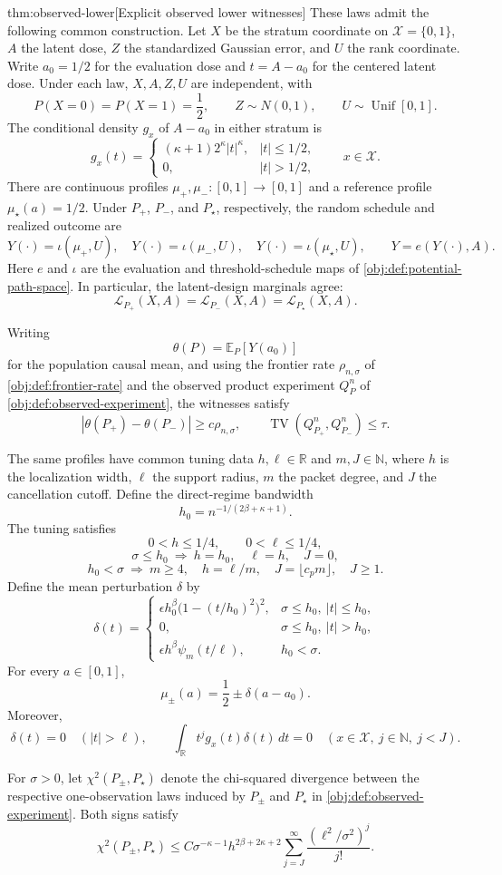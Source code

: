 \begin{theoremv}{thm:observed-lower}[Explicit observed lower witnesses]
These laws admit the following common construction. Let \(X\) be the stratum coordinate on \(\mathcal X=\{0,1\}\), \(A\) the latent dose, \(Z\) the standardized Gaussian error, and \(U\) the rank coordinate. Write \(a_0=1/2\) for the evaluation dose and \(t=A-a_0\) for the centered latent dose. Under each law, \(X,A,Z,U\) are independent, with
\[
P(X=0)=P(X=1)=\frac12,\qquad
Z\sim N(0,1),\qquad U\sim\operatorname{Unif}[0,1].
\]
The conditional density \(g_x\) of \(A-a_0\) in either stratum is
\[
g_x(t)=
\begin{cases}
(\kappa+1)2^\kappa|t|^\kappa,& |t|\le1/2,\\
0,& |t|>1/2,
\end{cases}
\qquad x\in\mathcal X.
\]
There are continuous profiles \(\mu_+,\mu_-:[0,1]\to[0,1]\) and a reference profile \(\mu_\star(a)=1/2\). Under \(P_+\), \(P_-\), and \(P_\star\), respectively, the random schedule and realized outcome are
\[
Y(\cdot)=\iota(\mu_+,U),\quad
Y(\cdot)=\iota(\mu_-,U),\quad
Y(\cdot)=\iota(\mu_\star,U),
\qquad
Y=e(Y(\cdot),A).
\]
Here \(e\) and \(\iota\) are the evaluation and threshold-schedule maps of \cref{obj:def:potential-path-space}. In particular, the latent-design marginals agree:
\[
\mathcal L_{P_+}(X,A)=
\mathcal L_{P_-}(X,A)=
\mathcal L_{P_\star}(X,A).
\]

Writing
\[
\theta(P)=\mathbb E_P[Y(a_0)]
\]
for the population causal mean, and using the frontier rate \(\rho_{n,\sigma}\) of \cref{obj:def:frontier-rate} and the observed product experiment \(Q_P^n\) of \cref{obj:def:observed-experiment}, the witnesses satisfy
\[
|\theta(P_+)-\theta(P_-)|\ge c\rho_{n,\sigma},
\qquad
\operatorname{TV}(Q_{P_+}^n,Q_{P_-}^n)\le\tau.
\]

The same profiles have common tuning data \(h,\ell\in\mathbb R\) and \(m,J\in\mathbb N\), where \(h\) is the localization width, \(\ell\) the support radius, \(m\) the packet degree, and \(J\) the cancellation cutoff. Define the direct-regime bandwidth
\[
h_0=n^{-1/(2\beta+\kappa+1)}.
\]
The tuning satisfies
\[
0<h\le1/4,\qquad 0<\ell\le1/4,
\]
\[
\sigma\le h_0\ \Longrightarrow\
h=h_0,\quad \ell=h,\quad J=0,
\]
\[
h_0<\sigma\ \Longrightarrow\
m\ge4,\quad h=\ell/m,\quad
J=\lfloor c_pm\rfloor,\quad J\ge1.
\]
Define the mean perturbation \(\delta\) by
\[
\delta(t)=
\begin{cases}
\epsilon h_0^\beta\bigl(1-(t/h_0)^2\bigr)^2,
  &\sigma\le h_0,\ |t|\le h_0,\\
0,&\sigma\le h_0,\ |t|>h_0,\\
\epsilon h^\beta\psi_m(t/\ell),&h_0<\sigma.
\end{cases}
\]
For every \(a\in[0,1]\),
\[
\mu_\pm(a)=\frac12\pm\delta(a-a_0).
\]
Moreover,
\[
\delta(t)=0\quad(|t|>\ell),
\qquad
\int_{\mathbb R}t^jg_x(t)\delta(t)\,dt=0
\quad(x\in\mathcal X,\ j\in\mathbb N,\ j<J).
\]

For \(\sigma>0\), let \(\chi^2(P_\pm,P_\star)\) denote the chi-squared divergence between the respective one-observation laws induced by \(P_\pm\) and \(P_\star\) in \cref{obj:def:observed-experiment}. Both signs satisfy
\[
\chi^2(P_\pm,P_\star)
\le
C\sigma^{-\kappa-1}h^{2\beta+2\kappa+2}
\sum_{j=J}^{\infty}\frac{(\ell^2/\sigma^2)^j}{j!}.
\]
\end{theoremv}

